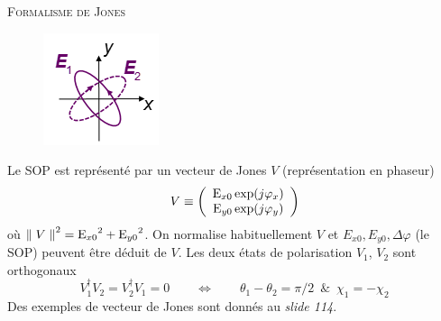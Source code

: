 	\textsc{Formalisme de Jones}\\
		\begin{figure}
	\vspace{-5mm}
	\includegraphics[scale=0.8]{ch1/image41.png}
	\end{figure}
	Le SOP est représenté par un vecteur de Jones $V$ (représentation en phaseur)
	\begin{equation}
	V \equiv \left( {\begin{array}{*{20}{c}}
{{{\rm{E}}_{x0}}\exp (j{\varphi _x})}\\
{{{\rm{E}}_{y0}}\exp (j{\varphi _y})}
\end{array}} \right)
	\end{equation}
	où ${\left\| {\;V\;} \right\|^2} = {{\rm{E}}_{x0}}^2 + {{\rm{E}}_{y0}}^2$. On normalise 
	habituellement $V$ et $E_{x0}, E_{y0}, \Delta \varphi$ (le SOP) peuvent être déduit de $V$. Les
	deux états de polarisation $V_1$, $V_2$ sont orthogonaux
	\begin{equation}
	V_1^\dag {V_2} = V_2^\dag {V_1} = 0\qquad\Leftrightarrow\qquad {\theta _1} - {\theta _2} = \pi /
	2\,\,\,\& \,\,\,{\chi _1} =  - {\chi _2}
	\end{equation}
	Des exemples de vecteur de Jones sont donnés au \textit{slide 114}.\\
	

